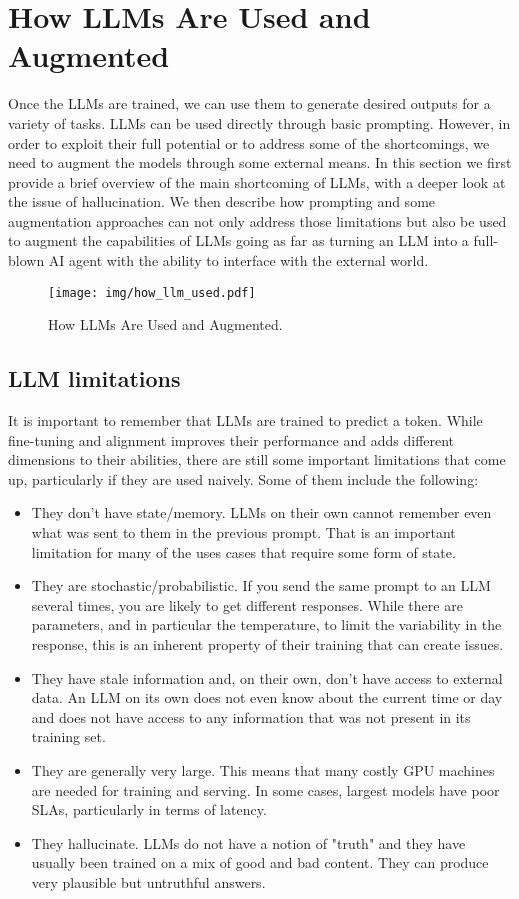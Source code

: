 \documentclass[conference]{IEEEtran}
\begin{document}
\section{How LLMs Are Used and Augmented}
\label{sec:LLM_used}
Once the LLMs are trained, we can use them to generate desired outputs for a variety of tasks.
LLMs can be used directly through basic prompting. However, in order to exploit their full potential or to address some of the shortcomings, we need to augment the models through some external means. 
In this section we first provide a brief overview of the main shortcoming of LLMs, with a deeper look at the issue of hallucination. We then describe how prompting and some augmentation approaches can not only address those limitations but also be used to augment the capabilities of LLMs going as far as turning an LLM into a full-blown AI agent with the ability to interface with the external world.

\begin{figure*}
    \centering
    \texttt{[image: img/how\_llm\_used.pdf]}
    \caption{How LLMs Are Used and Augmented.}
    \label{fig:how_llms_are_used}
\end{figure*}

\subsection{LLM limitations}

It is important to remember that LLMs are trained to predict a token. While fine-tuning and alignment improves their performance and adds different dimensions to their abilities, there are still some important limitations that come up, particularly if they are used naively. Some of them include the following:

\begin{itemize}
    \item They don't have state/memory. LLMs on their own cannot remember even what was sent to them in the previous prompt. That is an important limitation for many of the uses cases that require some form of state.
    \item They are stochastic/probabilistic. If you send the same prompt to an LLM several times, you are likely to get different responses. While there are parameters, and in particular the temperature, to limit the variability in the response, this is an inherent property of their training that can create issues.
    \item They have stale information and, on their own, don't have access to external data. An LLM on its own does not even know about the current time or day and does not have access to any information that was not present in its training set.
    \item They are generally very large. This means that many costly GPU machines are needed for training and serving. In some cases, largest models have poor SLAs, particularly in terms of latency.
    \item They hallucinate. LLMs do not have a notion of "truth" and they have usually been trained on a mix of good and bad content. They can produce very plausible but untruthful answers.
\end{itemize}
\end{document}
